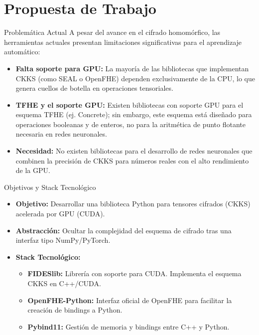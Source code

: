 \section{Propuesta de Trabajo}

\begin{frame}{Problemática Actual}
    A pesar del avance en el cifrado homomórfico, las herramientas actuales presentan limitaciones significativas para el aprendizaje automático:
    \begin{itemize}
        \item \textbf{Falta soporte para GPU:} La mayoría de las bibliotecas que implementan CKKS (como SEAL o OpenFHE) dependen exclusivamente de la CPU, lo que genera cuellos de botella en operaciones tensoriales.
        \item \textbf{TFHE y el soporte GPU:} Existen bibliotecas con soporte GPU para el esquema TFHE (ej. Concrete); sin embargo, este esquema está diseñado para operaciones booleanas y de enteros, no para la aritmética de punto flotante necesaria en redes neuronales.
        \item \textbf{Necesidad:} No existen bibliotecas para el desarrollo de redes neuronales que combinen la precisión de CKKS para números reales con el alto rendimiento de la GPU.
    \end{itemize}
\end{frame}

\begin{frame}{Objetivos y Stack Tecnológico}
    \begin{itemize}
        \item \textbf{Objetivo:} Desarrollar una biblioteca Python para tensores cifrados (CKKS) acelerada por GPU (CUDA).
        \item \textbf{Abstracción:} Ocultar la complejidad del esquema de cifrado tras una interfaz tipo NumPy/PyTorch.
        \item \textbf{Stack Tecnológico:}
        \begin{itemize}
            \item \textbf{FIDESlib:} Librería con soporte para CUDA. Implementa el esquema CKKS en C++/CUDA.
            \item \textbf{OpenFHE-Python:} Interfaz oficial de OpenFHE para facilitar la creación de bindings a Python.
            \item \textbf{Pybind11:} Gestión de memoria y bindings entre C++ y Python.
        \end{itemize}
    \end{itemize}
\end{frame}

